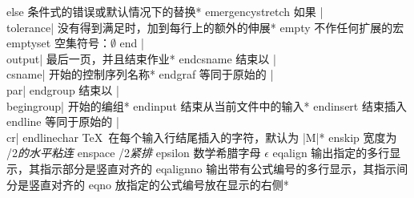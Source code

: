 \capcs else {条件式的错误或默认情况下的替换}*{\@else}
\capcs emergencystretch {如果 |\\tol\-er\-ance| 没有得到满足时，加到每行上的额外的伸展}*{}
\capcs empty {不作任何扩展的宏}{}{}
\capcs emptyset {空集符号：$\emptyset$}{}{}
\capcs end {|\\output| 最后一页，并且结束作业}*{}
\capcs endcsname {结束以 |\\csname| 开始的控制序列名称}*{}
\capcs endgraf {等同于原始的 |\\par|}{}{}
\capcs endgroup {结束以 |\\begingroup| 开始的编组}*{}
\capcs endinput {结束从当前文件中的输入}*{}
\capcs endinsert {结束插入}{}{}
\capcs endline {等同于原始的 |\\cr|}{}{}
\capcs endlinechar {\TeX\ 在每个输入行结尾插入的字符，默认为 |\twocarets M|}*{}
\capcs enskip {宽度为 /2\em 的水平粘连}{}{}
\capcs enspace {/2\em 紧排}{}{}
\capcs epsilon {数学希腊字母 $\epsilon$}{}{}
\capcs eqalign {输出指定的多行显示，其指示部分是竖直对齐的}{}{}
\capcs eqalignno {输出带有公式编号的多行显示，其指示间分是竖直对齐的}{}{}
\capcs eqno {放指定的公式编号放在显示的右侧}*{}
